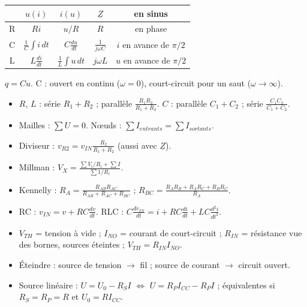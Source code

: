 \begin{thmbox}[title={Composants (C02, C04)}]
\begin{center}
\renewcommand{\arraystretch}{1.5}
\begin{tabular}{c|c|c|c|c}
 & $u(i)$ & $i(u)$ & $\underline Z$ & en sinus \\ \hline
R & $Ri$ & $u/R$ & $R$ & en phase \\
C & $\frac1C\int i\,dt$ & $C\frac{du}{dt}$ & $\frac1{j\omega C}$ & $i$ en avance de $\pi/2$ \\
L & $L\frac{di}{dt}$ & $\frac1L\int u\,dt$ & $j\omega L$ & $u$ en avance de $\pi/2$ \\
\end{tabular}
\end{center}
$q = Cu$. C : ouvert en continu ($\omega = 0$), court-circuit pour un saut ($\omega\to\infty$).
\end{thmbox}

\begin{thmbox}[title={Assemblages (C02)}]
\begin{itemize}
  \item $R$, $L$ : série $R_1 + R_2$ ; parallèle $\frac{R_1R_2}{R_1 + R_2}$.
        $C$ : parallèle $C_1 + C_2$ ; série $\frac{C_1C_2}{C_1 + C_2}$.
  \item Mailles : $\sum U = 0$. N\oe uds : $\sum I_{entrants} = \sum I_{sortants}$.
  \item Diviseur : $v_{R2} = v_{IN}\frac{R_2}{R_1 + R_2}$ (aussi avec $\underline Z$).
  \item Millman : $V_X = \frac{\sum V_i/R_i + \sum I}{\sum 1/R_i}$.
  \item Kennelly : $R_A = \frac{R_{AB}R_{AC}}{R_{AB} + R_{AC} + R_{BC}}$ ;
        $R_{BC} = \frac{R_AR_B + R_AR_C + R_BR_C}{R_A}$.
  \item RC : $v_{IN} = v + RC\frac{dv}{dt}$. RLC : $C\frac{dv_{IN}}{dt} = i + RC\frac{di}{dt} + LC\frac{d^2i}{dt^2}$.
\end{itemize}
\end{thmbox}

\begin{thmbox}[title={Thévenin / Norton (C03)}]
\begin{itemize}
  \item $V_{TH}$ = tension à vide ; $I_{NO}$ = courant de court-circuit ;
        $R_{IN}$ = résistance vue des bornes, sources éteintes ; $V_{TH} = R_{IN}I_{NO}$.
  \item Éteindre : source de tension $\to$ fil ; source de courant $\to$ circuit ouvert.
  \item Source linéaire : $U = U_0 - R_SI$ $\Leftrightarrow$ $U = R_PI_{CC} - R_PI$ ;
        équivalentes si $R_S = R_P = R$ et $U_0 = RI_{CC}$.
\end{itemize}
\end{thmbox}

